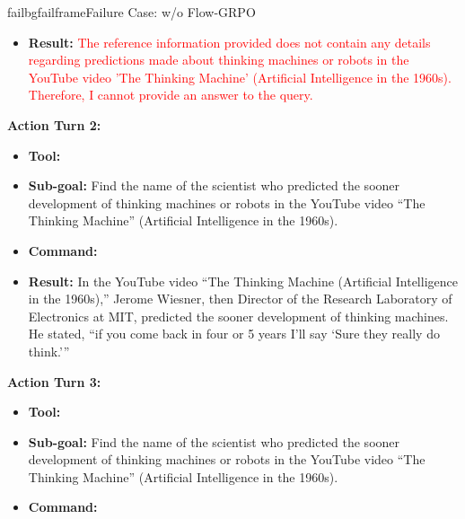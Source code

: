 \begin{small}
\begin{center}
\begin{casebox}{failbg}{failframe}{Failure Case: \model w/o Flow-GRPO}
\begin{itemize}[nosep, leftmargin=*]
        \item \textbf{Result:} \textcolor{red}{The reference information provided does not contain any details regarding predictions made about thinking machines or robots in the YouTube video 'The Thinking Machine' (Artificial Intelligence in the 1960s). Therefore, I cannot provide an answer to the query.}
    \end{itemize}

    \vspace{1em}

    \textbf{Action Turn 2:}
    \begin{itemize}[nosep, leftmargin=*]
        \item \textbf{Tool:} 
        \item \textbf{Sub-goal:} Find the name of the scientist who predicted the sooner development of thinking machines or robots in the YouTube video ``The Thinking Machine'' (Artificial Intelligence in the 1960s).
        \item \textbf{Command:}

        \item \textbf{Result:} In the YouTube video ``The Thinking Machine (Artificial Intelligence in the 1960s),'' Jerome Wiesner, then Director of the Research Laboratory of Electronics at MIT, predicted the sooner development of thinking machines. He stated, ``if you come back in four or 5 years I'll say `Sure they really do think.'''
    \end{itemize}

    \vspace{1em}

    \textbf{Action Turn 3:}
    \begin{itemize}[nosep, leftmargin=*]
        \item \textbf{Tool:} 
        \item \textbf{Sub-goal:} Find the name of the scientist who predicted the sooner development of thinking machines or robots in the YouTube video ``The Thinking Machine'' (Artificial Intelligence in the 1960s).
        \item \textbf{Command:}


\end{itemize}
\end{casebox}
\end{center}
\end{small}
